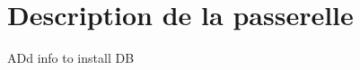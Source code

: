 

\chapter{Description de la passerelle}\label{ch:passerelle}


ADd info to install DB














